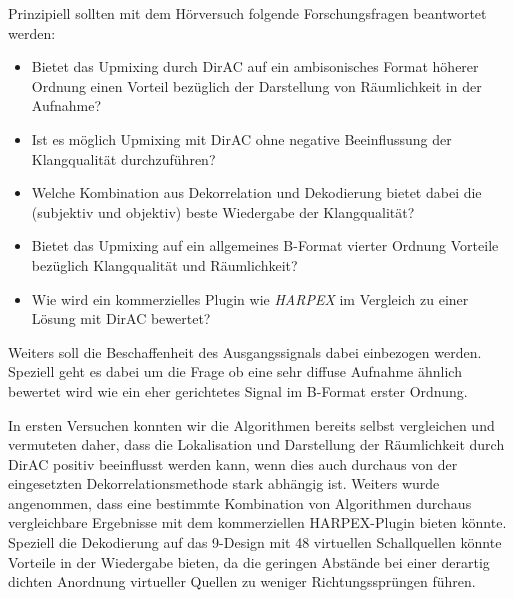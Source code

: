 Prinzipiell sollten mit dem Hörversuch folgende Forschungsfragen beantwortet werden:

\begin{itemize}
	\item Bietet das Upmixing durch DirAC auf ein ambisonisches Format höherer Ordnung einen Vorteil bezüglich der Darstellung von Räumlichkeit in der Aufnahme?
	\item Ist es möglich Upmixing mit DirAC ohne negative Beeinflussung der Klangqualität durchzuführen?
	\item Welche Kombination aus Dekorrelation und Dekodierung bietet dabei die (subjektiv und objektiv) beste Wiedergabe der Klangqualität?
	\item Bietet das Upmixing auf ein allgemeines B-Format vierter Ordnung Vorteile bezüglich Klangqualität und Räumlichkeit?
	\item Wie wird ein kommerzielles Plugin wie \textit{HARPEX} im Vergleich zu einer Lösung mit DirAC bewertet?
\end{itemize}

Weiters soll die Beschaffenheit des Ausgangssignals dabei einbezogen werden. Speziell geht es dabei um die Frage ob eine sehr diffuse Aufnahme ähnlich bewertet wird wie ein eher gerichtetes Signal im B-Format erster Ordnung.

In ersten Versuchen konnten wir die Algorithmen bereits selbst vergleichen und vermuteten daher, dass die Lokalisation und Darstellung der Räumlichkeit durch DirAC positiv beeinflusst werden kann, wenn dies auch durchaus von der eingesetzten Dekorrelationsmethode stark abhängig ist. Weiters wurde angenommen, dass eine bestimmte Kombination von Algorithmen durchaus vergleichbare Ergebnisse mit dem kommerziellen HARPEX-Plugin bieten könnte. Speziell die Dekodierung auf das 9-Design mit 48 virtuellen Schallquellen könnte Vorteile in der Wiedergabe bieten, da die geringen Abstände bei einer derartig dichten Anordnung virtueller Quellen zu weniger Richtungssprüngen führen.

